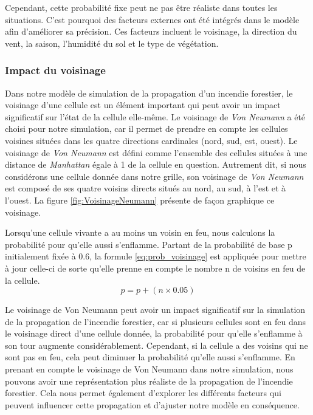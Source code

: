 
Cependant, cette probabilité fixe peut ne pas être réaliste dans toutes les situations. C'est pourquoi des facteurs externes ont été intégrés dans le modèle afin d'améliorer sa précision. Ces facteurs incluent le voisinage, la direction du vent, la saison, l'humidité du sol et le type de végétation.

\subsubsection{Impact du voisinage}

Dans notre modèle de simulation de la propagation d'un incendie forestier, le voisinage d'une cellule est un élément important qui peut avoir un impact significatif sur l'état de la cellule elle-même. Le voisinage de \textit{Von Neumann} a été choisi pour notre simulation, car il permet de prendre en compte les cellules voisines situées dans les quatre directions cardinales (nord, sud, est, ouest). Le voisinage de \textit{Von Neumann} est défini comme l'ensemble des cellules situées à une distance de \textit{Manhattan} égale à 1 de la cellule en question. Autrement dit, si nous considérons une cellule donnée dans notre grille, son voisinage de \textit{Von Neumann} est composé de ses quatre voisins directs situés au nord, au sud, à l'est et à l'ouest. La figure \ref{fig:VoisinageNeumann} présente de façon graphique ce voisinage.


Lorsqu'une cellule vivante a au moins un voisin en feu, nous calculons la probabilité pour qu'elle aussi s'enflamme. Partant de la probabilité de base p initialement fixée à 0.6, la formule \ref{eq:prob_voisinage} est appliquée pour mettre à jour celle-ci de sorte qu’elle prenne en compte le nombre n de voisins en feu de la cellule.
\begin{equation}
    p = p + (n \times 0.05)
    \label{eq:prob_voisinage}
\end{equation}

Le voisinage de Von Neumann peut avoir un impact significatif sur la simulation de la propagation de l'incendie forestier, car si plusieurs cellules sont en feu dans le voisinage direct d'une cellule donnée, la probabilité pour qu'elle s'enflamme à son tour augmente considérablement. Cependant, si la cellule a des voisins qui ne sont pas en feu, cela peut diminuer la probabilité qu'elle aussi s'enflamme. En prenant en compte le voisinage de Von Neumann dans notre simulation, nous pouvons avoir une représentation plus réaliste de la propagation de l'incendie forestier. Cela nous permet également d'explorer les différents facteurs qui peuvent influencer cette propagation et d'ajuster notre modèle en conséquence.

